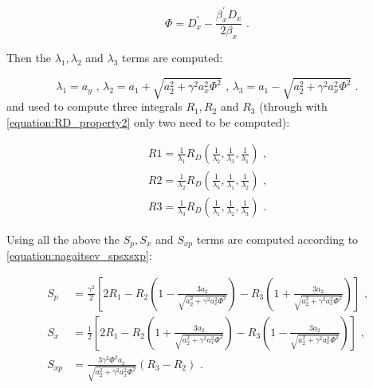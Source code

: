 \begin{equation}
    \Phi = D_x^{\prime} - \frac{\beta_x^{\prime} D_x}{2 \beta_x} \text{ .}
\end{equation}

Then the \(\lambda_1, \lambda_2\) and \(\lambda_3\) terms are computed:

\begin{equation}
    \lambda_1 = a_y \text{ , }
    \lambda_2 = a_1 + \sqrt{a_2^{2} + \gamma^2 a_x^{2} \Phi^2} \text{ , }
    \lambda_3 = a_1 - \sqrt{a_2^{2} + \gamma^2 a_x^{2} \Phi^2} \text{ .}
    \label{equation:nagaitsev_lambdas}
\end{equation}
and used to compute three integrals \(R_1, R_2\) and \(R_3\) (through with \eqref{equation:RD_property2} only two need to be computed):

\begin{equation}
    \begin{aligned}
        R1 = \frac{1}{\lambda_1} R_D(\frac{1}{\lambda_2}, \frac{1}{\lambda_3}, \frac{1}{\lambda_1}) \text{ ,} \\
        R2 = \frac{1}{\lambda_2} R_D(\frac{1}{\lambda_3}, \frac{1}{\lambda_1}, \frac{1}{\lambda_2}) \text{ ,} \\
        R3 = \frac{1}{\lambda_3} R_D(\frac{1}{\lambda_1}, \frac{1}{\lambda_2}, \frac{1}{\lambda_3}) \text{ .}
    \end{aligned}
    \label{equation:nagaitsev_r1r2r3}
\end{equation}

Using all the above the \(S_p, S_x\) and \(S_{xp}\) terms are computed according to \eqref{equation:nagaitsev_spsxsxp}:

\begin{equation}
    \begin{aligned}
        S_p &= \frac{\gamma^2}{2} \left[ 2 R_1 - R_2 \left(1 - \frac{3 a_2}{\sqrt{a_2^{2} + \gamma^2 a_x^{2} \Phi^2}}\right) - R_3 \left(1 + \frac{3 a_2}{\sqrt{a_2^{2} + \gamma^2 a_x^{2} \Phi^2}}\right) \right] \text{ ,} \\
        S_x &= \frac{1}{2} \left[ 2 R_1 - R_2 \left(1 + \frac{3 a_2}{\sqrt{a_2^{2} + \gamma^2 a_x^{2} \Phi^2}}\right) - R_3 \left(1 - \frac{3 a_2}{\sqrt{a_2^{2} + \gamma^2 a_x^{2} \Phi^2}}\right) \right] \text{ ,} \\
        S_{xp} &= \frac{3 \gamma^2 \Phi^2 a_x}{\sqrt{a_2^{2} + \gamma^2 a_x^{2} \Phi^2}} \left( R_3 - R_2 \right) \text{ .}
    \end{aligned}
    \label{equation:nagaitsev_spsxsxp}
\end{equation}

